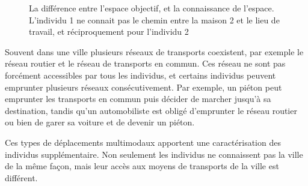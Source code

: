 \documentclass[a4paper]{article}
\begin{document}
\begin{figure}
  \centering
  \caption{La différence entre l'espace objectif, et la connaissance de
  l'espace. L'individu 1 ne connait pas le chemin entre la maison 2 et le lieu
  de travail, et réciproquement pour l'individu 2}
  \label{fig:espace}
\end{figure}

Souvent dans une ville plusieurs réseaux de transports coexistent, par exemple
le réseau routier et le réseau de transports en commun. Ces réseau ne sont pas
forcément accessibles par tous les individus, et certains individus peuvent
emprunter plusieurs réseaux consécutivement. Par exemple, un piéton peut
emprunter les transports en commun puis décider de marcher jusqu'à sa
destination, tandis qu'un automobiliste est obligé d'emprunter le réseau routier
ou bien de garer sa voiture et de devenir un piéton.

Ces types de déplacements multimodaux apportent une caractérisation des
individus supplémentaire. Non seulement les individus ne connaissent pas la
ville de la même façon, mais leur accès aux moyens de transports de la ville est
différent.
\end{document}
